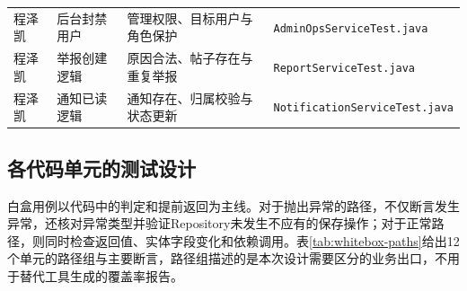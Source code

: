 \documentclass[bwprint]{report}
\begin{document}
\begin{longtable}{P{2cm}P{3.5cm}P{4.1cm}P{4.7cm}}
程泽凯 & 后台封禁用户 & 管理权限、目标用户与角色保护 & \texttt{AdminOps\hspace{0pt}Service\hspace{0pt}Test.java} \\
程泽凯 & 举报创建逻辑 & 原因合法、帖子存在与重复举报 & \texttt{ReportService\hspace{0pt}Test.java} \\
程泽凯 & 通知已读逻辑 & 通知存在、归属校验与状态更新 & \texttt{Notification\hspace{0pt}Service\hspace{0pt}Test.java} \\
\bottomrule
\end{longtable}

\subsection{各代码单元的测试设计}
白盒用例以代码中的判定和提前返回为主线。对于抛出异常的路径，不仅断言发生异常，还核对异常类型并验证Repository未发生不应有的保存操作；对于正常路径，则同时检查返回值、实体字段变化和依赖调用。表\ref{tab:whitebox-paths}给出12个单元的路径组与主要断言，路径组描述的是本次设计需要区分的业务出口，不用于替代工具生成的覆盖率报告。
\end{document}
